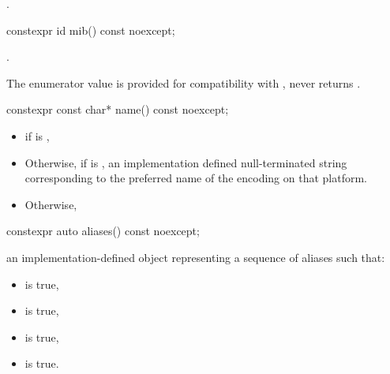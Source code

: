 \documentclass{wg21}
\begin{document}
\begin{addedblock}
\begin{itemdescr}
    \postconditions {}.
\end{itemdescr}





\begin{itemdecl}
constexpr id mib() const noexcept;
\end{itemdecl}

\begin{itemdescr}
\returns {}.

\begin{note}
	The enumerator value  is provided for compatibility with \cite{rfc3808},
	 never returns .
\end{note}

\end{itemdescr}

\begin{itemdecl}
constexpr const char* name() const noexcept;
\end{itemdecl}
\begin{itemdescr}
\returns 

\begin{itemize}
    \item {} if  is ,
    \item Otherwise, if  is , an implementation defined null-terminated string corresponding to the preferred name of the encoding on that platform.
    \item Otherwise, 
\end{itemize}
\end{itemdescr}


\begin{itemdecl}
constexpr auto aliases() const noexcept;
\end{itemdecl}

\begin{itemdescr}
\returns an implementation-defined object  representing a sequence of aliases such that:
\begin{itemize}
    \item {} is true,
    \item {} is true,
    \item {} is true,
    \item {} is true.
\end{itemize}


\end{itemdescr}
\end{addedblock}
\end{document}
